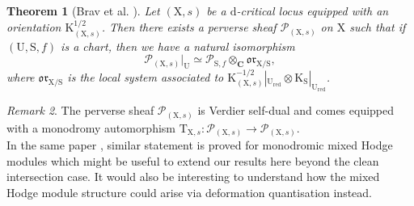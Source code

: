 \documentclass{article}
\theoremstyle{plain}
\newtheorem{theorem}{Theorem}[subsection]   %
\theoremstyle{definition}
\theoremstyle{remark}
\newtheorem{remark}[theorem]{Remark}
\newcommand{\mr}{\mathrm}
\newcommand{\C}{\mathbf C}
\newcommand{\3}{\vspace{3mm}}
\newcommand{\2}{\vspace{2mm}}
\newcommand{\1}{\vspace{1mm}}
\begin{document}
\2
\begin{theorem}[Brav et al. \cite{bbdjs}]\label{pervdcrit}
 Let $(\mr{X},s)$ be a $\mr{d}$-critical locus equipped with an orientation $\mr{K}_{(\mr{X},s)}^{1/2}$. Then there exists a perverse sheaf $\mathscr{P}_{(\mr{X},s)}$ on $\mr{X}$ such that if $(\mr{U},\mr{S},f)$ is a chart, then we have a natural isomorphism $$\mathscr{P}_{(\mr{X},s)}|_{\mr{U}} \simeq \mathscr{P}_{\mr{S},f}\otimes_{\C}\mathfrak{or}_{\mr{X/S}},$$ where $\mathfrak{or}_{\mr{X/S}}$ is the local system associated to $\mr{K}_{(\mr{X},s)}^{-1/2}|_{\mr{U_{red}}}\otimes \mr{K}_{\mr{S}}|_{\mr{U_{red}}}$. 
\end{theorem}
\2
\begin{remark}
The perverse sheaf $\mathscr{P}_{(\mr{X},s)}$ is Verdier self-dual and comes equipped with a monodromy automorphism $\mr{T}_{\mr{X},s}:\mathscr{P}_{(\mr{X},s)}\to \mathscr{P}_{(\mr{X},s)}$.\\
In the same paper \cite{bbdjs}, similar statement is proved for monodromic mixed Hodge modules which might be useful to extend our results here beyond the clean intersection case. It would also be interesting to understand how the mixed Hodge module structure could arise via deformation quantisation instead.
\end{remark}
\end{document}

